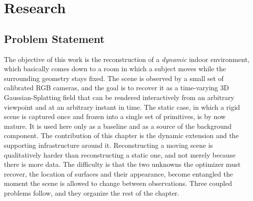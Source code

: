 \chapter{Research}
\label{ch:research}

\section{Problem Statement}

The objective of this work is the reconstruction of a \emph{dynamic} indoor
environment, which basically comes down to a room in which a subject moves while the surrounding geometry stays fixed. The scene is observed by a small set of calibrated RGB cameras, and the goal
is to recover it as a time-varying 3D Gaussian-Splatting field that can be rendered
interactively from an arbitrary viewpoint and at an arbitrary instant in time. The
static case, in which a rigid scene is captured once and frozen into a single set of
primitives, is by now mature. It is used here only as a baseline and as a source of
the background component. The contribution of this chapter is the dynamic extension
and the supporting infrastructure around it. Reconstructing a moving scene is qualitatively harder than reconstructing a static
one, and not merely because there is more data. The difficulty is that the two
unknowns the optimizer must recover, the location of surfaces and their
appearance, become entangled the moment the scene is allowed to change between
observations. Three coupled problems follow, and they organize the
rest of the chapter.

